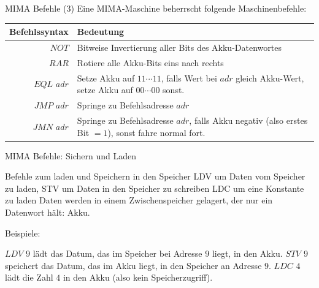 \documentclass[handout]{beamer}
\begin{document}
\begin{frame}{MIMA Befehle (3)}
	Eine MIMA-Maschine beherrscht folgende Maschinenbefehle:
	
	\vspace{.5cm}
	
	\begin{tabular}{r | p{8cm} }
		Befehlssyntax & Bedeutung\\\hline\hline \ip
		$NOT$ & Bitweise Invertierung aller Bits des Akku-Datenwortes\\\hline\ip
		$RAR$ & Rotiere alle Akku-Bits eins nach rechts\\\hline\ip
		$EQL$ $adr$ & Setze Akku auf $11\cdots11$, falls Wert bei $adr$ gleich Akku-Wert, setze Akku auf $00\cdots00$ sonst.\\\hline\ip
		$JMP$ $adr$ & Springe zu Befehlsadresse $adr$\\\hline\ip
		$JMN$ $adr$ & Springe zu Befehlsadresse $adr$, falls Akku negativ (also erstes Bit $=1$), sonst fahre normal fort.
	\end{tabular}
\end{frame}


\begin{frame}{MIMA Befehle: Sichern und Laden}
	\begin{itemize}
		\pitem Befehle zum laden und Speichern in den Speicher
		\pitem LDV um Daten vom Speicher zu laden, STV um Daten in den Speicher zu schreiben
		\pitem LDC um eine Konstante zu laden
		\pitem Daten werden in einem Zwischenspeicher gelagert, der nur ein Datenwort hält\ip : Akku.
	\end{itemize}

	\bp

	Beispiele:
	
	\begin{itemize}
		\pitem $LDV$ $9$ lädt das Datum, das im Speicher bei Adresse $9$ liegt, in den Akku.
		\pitem $STV$ $9$ speichert das Datum, das im Akku liegt, in den Speicher an Adresse $9$.
		\pitem $LDC$ $4$ lädt die Zahl $4$ in den Akku (also kein Speicherzugriff).
	\end{itemize}
\end{frame}
\end{document}
